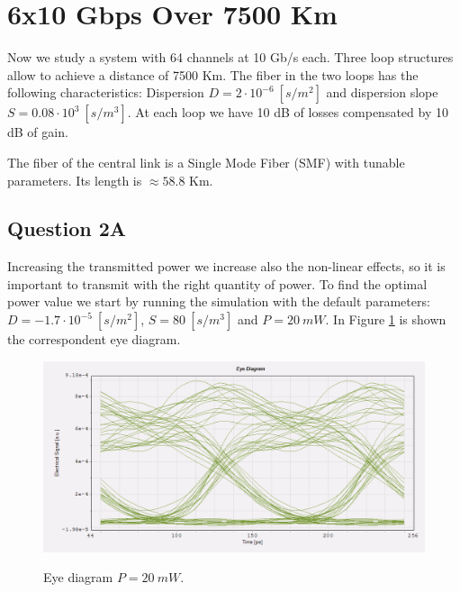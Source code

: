 \documentclass[a4paper,10pt]{report}
\begin{document}
\newpage
\section*{6x10 Gbps Over 7500 Km}

Now we study a system with 64 channels at 10 Gb/s each. Three loop structures allow to achieve a distance of 7500 Km.
The fiber in the two loops has the following characteristics:
Dispersion $D=2 \cdot 10^{-6} \ [s/m^2]$ and dispersion slope $S=0.08 \cdot 10^{3} \ [s/m^3]$.
At each loop we have 10 dB of losses compensated by 10 dB of gain.

The fiber of the central link is a Single Mode Fiber (SMF) with tunable parameters. Its length is $\approx 58.8$ Km.


\subsection*{Question 2A}
Increasing the transmitted power we increase also the non-linear effects, so it is important to transmit
with the right quantity of power.
To find the optimal power value we start by running the simulation with the default parameters:\\
$D=-1.7 \cdot 10^{-5} \ [s/m^2]$, $S=80 \ [s/m^3]$ and $P=20 \ mW$.
In Figure \ref{q2_1} is shown the correspondent eye diagram.

\begin{figure}[!ht]
   \centering
   \includegraphics[width=12cm]{q2_1.png}\\
   \caption{Eye diagram $P=20 \ mW$.}
   \label{q2_1}
\end{figure}
\end{document}
